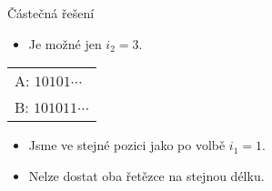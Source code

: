 \begin{frame}{Částečná řešení}
\begin{minipage}{0.67\textwidth}
\begin{minipage}{0.59\textwidth}
\begin{itemize}[<+->]
    \item Je možné jen $i_2=3$.
    \end{itemize}
     \end{minipage}
    \begin{minipage}{0.4\textwidth}
    \begin{tabular}{ l}
    A: $10101\cdots$\\
    B: $101011\cdots$
    \end{tabular}
    \begin{itemize}[<+->]
        \item Jsme ve stejné pozici jako po volbě $i_1=1$. 
        \item Nelze dostat oba řetězce na stejnou délku.
    \end{itemize}
     \end{minipage}
     \end{minipage}
    
    \end{frame}
    
